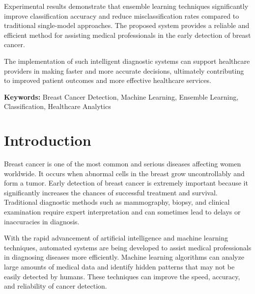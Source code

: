 \documentclass[12pt]{article}
\begin{document}
\vspace{0.3cm}

\noindent Experimental results demonstrate that ensemble learning techniques significantly improve classification accuracy and reduce misclassification rates compared to traditional single-model approaches. The proposed system provides a reliable and efficient method for assisting medical professionals in the early detection of breast cancer.

\vspace{0.3cm}

\noindent The implementation of such intelligent diagnostic systems can support healthcare providers in making faster and more accurate decisions, ultimately contributing to improved patient outcomes and more effective healthcare services.

\vspace{0.5cm}

\noindent \textbf{Keywords:} Breast Cancer Detection, Machine Learning, Ensemble Learning, Classification, Healthcare Analytics

\newpage
\tableofcontents

\newpage
\listoftables

\newpage
{}

\section{Introduction}

Breast cancer is one of the most common and serious diseases affecting women worldwide. It occurs when abnormal cells in the breast grow uncontrollably and form a tumor. Early detection of breast cancer is extremely important because it significantly increases the chances of successful treatment and survival. Traditional diagnostic methods such as mammography, biopsy, and clinical examination require expert interpretation and can sometimes lead to delays or inaccuracies in diagnosis.

With the rapid advancement of artificial intelligence and machine learning techniques, automated systems are being developed to assist medical professionals in diagnosing diseases more efficiently. Machine learning algorithms can analyze large amounts of medical data and identify hidden patterns that may not be easily detected by humans. These techniques can improve the speed, accuracy, and reliability of cancer detection.
\end{document}
